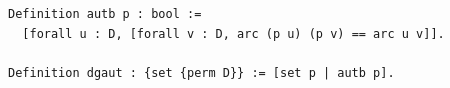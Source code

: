 \begin{lstlisting}[language=Rocq]
Definition autb p : bool :=
  [forall u : D, [forall v : D, arc (p u) (p v) == arc u v]].

Definition dgaut : {set {perm D}} := [set p | autb p].
\end{lstlisting}
